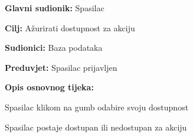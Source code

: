 					\noindent {}
					\begin{packed_item}
	
						\item \textbf{Glavni sudionik: }\text Spasilac
						\item  \textbf{Cilj:} \text Ažurirati dostupnost za akciju
						\item  \textbf{Sudionici:} \text Baza podataka
						\item  \textbf{Preduvjet:} \text Spasilac prijavljen
						\item  \textbf{Opis osnovnog tijeka:}
						
						\item[] \begin{packed_enum}
	
							\item Spasilac klikom na gumb odabire svoju dostupnost
							\item Spasilac postaje dostupan ili nedostupan za akciju
						\end{packed_enum}
					\end{packed_item}

